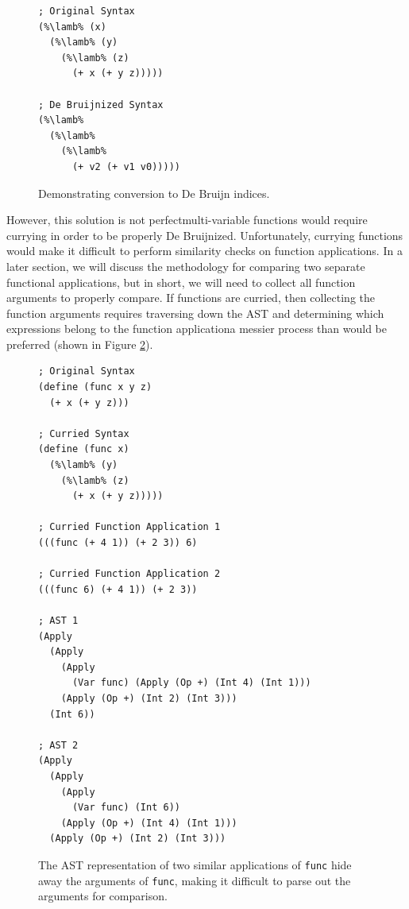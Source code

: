 \documentclass[12pt]{article}
\newcommand{\key}[1]{\texttt{#1}}
\newcommand{\lamb}[0]{\key{$\lambda$}}
\begin{document}
\begin{figure}[H]
  \begin{mdframed}
    \begin{lstlisting}[escapechar=\%]
; Original Syntax
(%\lamb% (x)
  (%\lamb% (y)
    (%\lamb% (z)
      (+ x (+ y z)))))

; De Bruijnized Syntax
(%\lamb%
  (%\lamb% 
    (%\lamb% 
      (+ v2 (+ v1 v0)))))
    \end{lstlisting}
  \end{mdframed}
  \caption{Demonstrating conversion to De Bruijn indices.}
  \label{debruijn}
\end{figure}

However, this solution is not perfect\textemdash multi-variable functions would require currying in order to be properly De Bruijnized. Unfortunately, currying functions would make it difficult to perform similarity checks on function applications. In a later section, we will discuss the methodology for comparing two separate functional applications, but in short, we will need to collect all function arguments to properly compare. If functions are curried, then collecting the function arguments requires traversing down the AST and determining which expressions belong to the function application\textemdash a messier process than would be preferred (shown in Figure \ref{curried-ast}).

\hfill

\begin{figure}[H]
  \begin{mdframed}
    \begin{lstlisting}[escapechar=\%]
; Original Syntax
(define (func x y z)
  (+ x (+ y z)))

; Curried Syntax
(define (func x)
  (%\lamb% (y)
    (%\lamb% (z)
      (+ x (+ y z)))))

; Curried Function Application 1
(((func (+ 4 1)) (+ 2 3)) 6)

; Curried Function Application 2
(((func 6) (+ 4 1)) (+ 2 3))

; AST 1
(Apply
  (Apply
    (Apply
      (Var func) (Apply (Op +) (Int 4) (Int 1)))
    (Apply (Op +) (Int 2) (Int 3)))
  (Int 6))

; AST 2
(Apply
  (Apply
    (Apply
      (Var func) (Int 6))
    (Apply (Op +) (Int 4) (Int 1)))
  (Apply (Op +) (Int 2) (Int 3)))
    \end{lstlisting}
  \end{mdframed}
  \caption{The AST representation of two similar applications of \key{func} hide away the arguments of \key{func}, making it difficult to parse out the arguments for comparison.}
  \label{curried-ast}
\end{figure}
\end{document}
